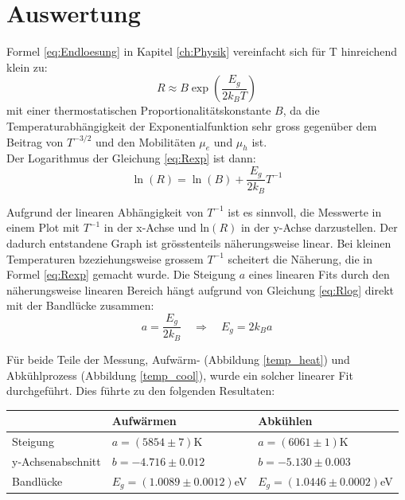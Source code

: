 \documentclass[a4paper,parskip,11pt, DIV12]{scrreprt}
\begin{document}
\chapter{Auswertung}

Formel \ref{eq:Endloesung} in Kapitel \ref{ch:Physik} vereinfacht sich für T hinreichend klein zu:
\begin{equation}
\label{eq:Rexp}
R \approx B \exp \left(\frac{E_g}{2 k_B T}\right)
\end{equation}
mit einer thermostatischen Proportionalitätskonstante $B$, da die Temperaturabhängigkeit der Exponentialfunktion sehr gross gegenüber dem Beitrag von $T^{-3/2}$ und den Mobilitäten $\mu_e$ und $\mu_h$ ist.
\\
Der Logarithmus der Gleichung \ref{eq:Rexp} ist dann:
\begin{equation}
\label{eq:Rlog}
\ln(R) = \ln (B) + \frac{E_g}{2 k_B} T^{-1}
\end{equation}

Aufgrund der linearen Abhängigkeit von $T^{-1}$ ist es sinnvoll, die Messwerte in einem Plot mit $T^{-1}$ in der x-Achse und ln$(R)$ in der y-Achse darzustellen. Der dadurch entstandene Graph ist grösstenteils näherungsweise linear. Bei kleinen Temperaturen bzeziehungsweise grossem $T^{-1}$ scheitert die Näherung, die in Formel \ref{eq:Rexp} gemacht wurde. Die Steigung $a$ eines linearen Fits durch den näherungsweise linearen Bereich hängt aufgrund von Gleichung \ref{eq:Rlog} direkt mit der Bandlücke zusammen:
\begin{equation}
\label{eq:bandgap}
a = \frac{E_g}{2 k_B} \quad \Rightarrow \quad E_g = 2 k_B a
\end{equation}


Für beide Teile der Messung, Aufwärm- (Abbildung \ref{temp_heat}) und Abkühlprozess (Abbildung \ref{temp_cool}), wurde ein solcher linearer Fit durchgeführt. Dies führte zu den folgenden Resultaten:

%
\begin{center}
\begin{tabular}{lll}
					& Aufwärmen 					& Abkühlen\\
	\hline
	Steigung 			& $a = (5854\pm7)$K			& $a = (6061\pm1)$K\\
	y-Achsenabschnitt	& $b = -4.716\pm0.012$			& $b = -5.130\pm0.003$\\
	Bandlücke			& $E_{g} = (1.0089\pm0.0012)$eV	& $E_{g} = (1.0446\pm0.0002)$eV\\
	
%
\end{tabular}
\end{center}
%
\end{document}
